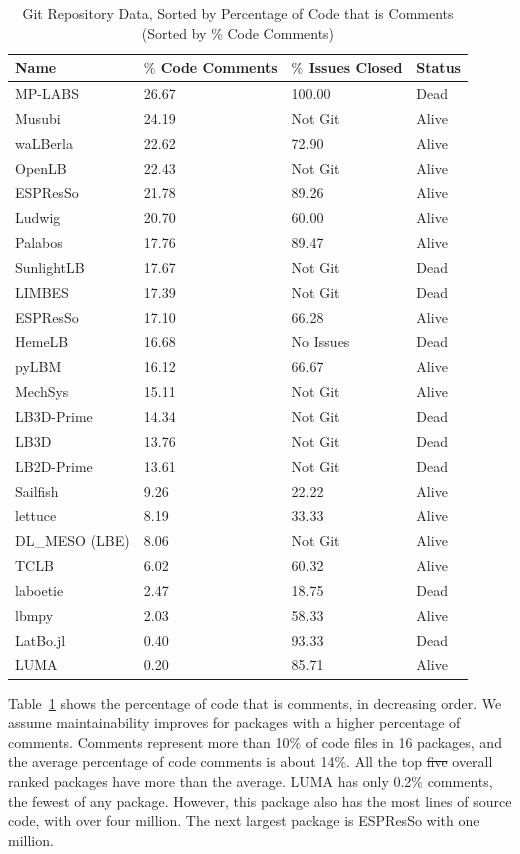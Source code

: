 \documentclass[final, 3p, times, authoryear]{elsarticle}
\newcommand{\esp}{ESPResSo\nolinebreak\hspace{-.05em}\raisebox{.4ex}{\small\bf
+}\nolinebreak\hspace{-.10em}\raisebox{.4ex}{\small\bf +}}
\providecommand{\DIFaddtex}[1]{{\protect\color{blue}\uwave{#1}}} %
\providecommand{\DIFdeltex}[1]{{\protect\color{red}\sout{#1}}}                      %
\providecommand{\DIFaddbegin}{} %
\providecommand{\DIFaddend}{} %
\providecommand{\DIFdelbegin}{} %
\providecommand{\DIFdelend}{} %
\providecommand{\DIFadd}[1]{\texorpdfstring{\DIFaddtex{#1}}{#1}} %
\providecommand{\DIFdel}[1]{\texorpdfstring{\DIFdeltex{#1}}{}} %
\begin{document}
\begin{table}[ht!]
	\begin{center}
		\begin{tabular}{ p{3.5cm}p{3.5cm}p{3.5cm}p{2.5cm} }
			\toprule
			Name & $\%$ Code Comments & $\%$ Issues Closed & Status\\
			\midrule
			MP-LABS & 26.67 & 100.00 & Dead\\
			Musubi & 24.19 & Not Git & Alive\\
			waLBerla & 22.62 & 72.90 & Alive\\
			OpenLB & 22.43 & Not Git & Alive\\
			ESPResSo & 21.78 & 89.26 & Alive\\
			Ludwig& 20.70 & 60.00 & Alive\\
			Palabos & 17.76 & 89.47 & Alive\\
			SunlightLB & 17.67 & Not Git & Dead\\
			LIMBES & 17.39 & Not Git & Dead\\
			\esp & 17.10 & 66.28 & Alive\\
			HemeLB & 16.68 & No Issues & Dead\\
			pyLBM & 16.12 & 66.67 & Alive\\
			MechSys & 15.11 & Not Git & Alive\\
			LB3D-Prime & 14.34 & Not Git & Dead\\
			LB3D & 13.76 & Not Git & Dead\\
			LB2D-Prime & 13.61 & Not Git & Dead\\
			Sailfish & 9.26 & 22.22 & Alive\\
			lettuce & 8.19 & 33.33 & Alive\\
			DL\_MESO (LBE) & 8.06 & Not Git & Alive\\
			TCLB & 6.02 & 60.32 & Alive\\
			laboetie & 2.47 & 18.75 & Dead\\	
			lbmpy& 2.03 & 58.33 & Alive\\	
			LatBo.jl & 0.40 & 93.33 & Dead\\
			LUMA& 0.20 & 85.71 & Alive\\
			\bottomrule
		\end{tabular}
		\caption{Git Repository Data, Sorted by Percentage of Code that is
			Comments (Sorted by $\%$ Code Comments)} \label{gitrepodata}
	\end{center}
\end{table}

Table~\ref{gitrepodata} shows the percentage of code that is comments, in
decreasing order. We assume maintainability improves for packages with a higher
percentage of comments. Comments represent more than 10\% of code files in 16
packages, and the average percentage of code comments is about 14\%. All the top
\DIFdelbegin \DIFdel{five }\DIFdelend \DIFaddbegin \DIFadd{four }\DIFaddend overall ranked packages have more than the average. LUMA has only 0.2\%
comments, the fewest of any package. However, this package also has the most
lines of source code, with over four million. The next largest package is \esp{}
with one million.
\end{document}
